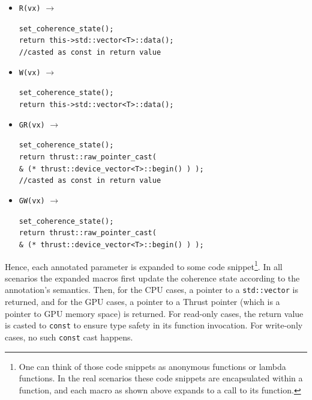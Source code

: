 \begin{small}
\begin{itemize}
 \item \texttt{R(vx)} $\longrightarrow$ 
 \begin{minipage}[t]{0.8\textwidth}
  \texttt{set\_coherence\_state();}\\
  \texttt{return this->std::vector<T>::data();}\\
  \texttt{//casted as const in return value}
 \end{minipage}
 \item \texttt{W(vx)} $\longrightarrow$ 
 \begin{minipage}[t]{0.8\textwidth} \texttt{set\_coherence\_state();}\\
 \texttt{return this->std::vector<T>::data();}
 \end{minipage}
 \item \texttt{GR(vx)} $\longrightarrow$ \begin{minipage}[t]{0.8\textwidth}
 \texttt{set\_coherence\_state();}\\
 \texttt{return thrust::raw\_pointer\_cast(}\\
 \hspace*{1em}\texttt{\& (* thrust::device\_vector<T>::begin() ) );}\\
 \texttt{//casted as const in return value}
 \end{minipage}
 \item \texttt{GW(vx)} $\longrightarrow$ 
\begin{minipage}[t]{0.8\textwidth} \texttt{set\_coherence\_state();\\ return thrust::raw\_pointer\_cast(}\\
\hspace*{1em}\texttt{\& (* thrust::device\_vector<T>::begin() ) );}
\end{minipage}
\end{itemize}
\end{small}

Hence, each annotated parameter is expanded to some code snippet\footnote{One can think of those code snippets as
anonymous functions or lambda functions. 
In the real scenarios these code snippets are encapsulated within a function,
and each macro as shown above expands to a call to its function.}.
In all scenarios the expanded macros first update the coherence state according to the annotation's semantics.
Then, for the CPU cases, a pointer to a \texttt{std::vector} is returned,
and for the GPU cases, a pointer to a Thrust pointer (which is a pointer to GPU memory space) is returned.
For read-only cases, the return value is casted to \texttt{const} to ensure type safety in its function invocation.
For write-only cases, no such \texttt{const} cast happens.

